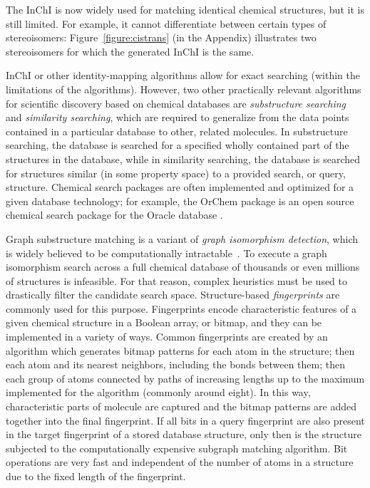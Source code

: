 \documentclass{sig-alternate}
\begin{document}

The InChI is now widely used for matching identical chemical structures, but it
is still limited. For example, it cannot differentiate between
certain types of stereoisomers: Figure~\ref{figure:cistrans} (in the Appendix) illustrates two stereoisomers for which
the generated InChI is the same.

InChI or other identity-mapping algorithms allow for exact searching
(within the limitations of the algorithms). However, two other
practically relevant algorithms for scientific discovery based on
chemical databases are \emph{substructure searching} and
\emph{similarity searching}, which are required to generalize from the
data points contained in a particular database to other, related
molecules. In substructure searching, the database is searched for a
specified wholly contained part of the structures in the database,
while in similarity searching, the database is searched for structures
similar (in some property space) to a provided search, or query,
structure. Chemical search packages are often implemented and
optimized for a given database technology; for example, the OrChem
package is an open source chemical search package for the Oracle
database \cite{rijnbeek2009}.

Graph substructure matching is a variant of \emph{graph isomorphism
  detection}, which is widely believed to be computationally
intractable~\cite{cordella2001}. To execute a graph isomorphism search
across a full chemical database of thousands or even millions of
structures is infeasible. For that reason, complex heuristics must be
used to drastically filter the candidate search space. Structure-based
\emph{fingerprints} are commonly used for this purpose. Fingerprints
encode characteristic features of a given chemical structure in a
Boolean array, or bitmap, and they can be implemented in a variety of
ways. Common fingerprints are created by an algorithm which generates
bitmap patterns for each atom in the structure; then each atom and its
nearest neighbors, including the bonds between them; then each group
of atoms connected by paths of increasing lengths up to the maximum
implemented for the algorithm (commonly around eight). In this way,
characteristic parts of molecule are captured and the bitmap patterns
are added together into the final fingerprint. If all bits in a query
fingerprint are also present in the target fingerprint of a stored
database structure, only then is the structure subjected to the
computationally expensive subgraph matching algorithm. Bit operations
are very fast and independent of the number of atoms in a structure
due to the fixed length of the fingerprint.
\end{document}
